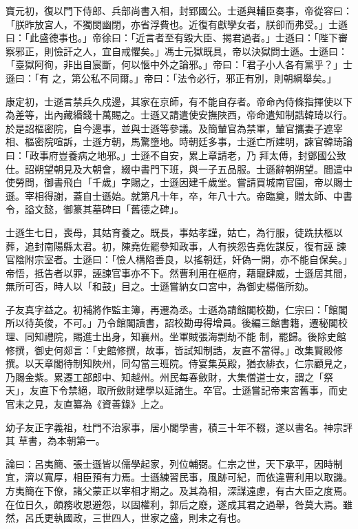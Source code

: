 \begin{pinyinscope}
 寶元初，復以門下侍郎、兵部尚書入相，封郢國公。士遜與輔臣奏事，帝從容曰：「朕昨放宮人，不獨閔幽閉，亦省浮費也。近復有獻孿女者，朕卻而弗受。」士遜曰：「此盛德事也。」帝徐曰：「近言者至有毀大臣、揭君過者。」士遜曰：「陛下審察邪正，則憸訐之人，宜自戒懼矣。」馮士元獄既具，帝以決獄問士遜。士遜曰：「臺獄阿徇，非出自宸斷，何以愜中外之論邪。」帝曰：「君子小人各有黨乎？」士遜曰：「有
 之，第公私不同爾。」帝曰：「法令必行，邪正有別，則朝綱舉矣。」



 康定初，士遜言禁兵久戍邊，其家在京師，有不能自存者。帝命內侍條指揮使以下為差等，出內藏緡錢十萬賜之。士遜又請遣使安撫陜西，帝命遣知制誥韓琦以行。於是詔樞密院，自今邊事，並與士遜等參議。及簡輦官為禁軍，輦官攜妻子遮宰相、樞密院喧訴，士遜方朝，馬驚墮地。時朝廷多事，士遜亡所建明，諫官韓琦論曰：「政事府豈養病之地邪。」士遜不自安，累上章請老，乃
 拜太傅，封鄧國公致仕。詔朔望朝見及大朝會，綴中書門下班，與一子五品服。士遜辭朝朔望。間遣中使勞問，御書飛白「千歲」字賜之，士遜因建千歲堂。嘗請買城南官園，帝以賜士遜。宰相得謝，蓋自士遜始。就第凡十年，卒，年八十六。帝臨奠，贈太師、中書令，謚文懿，御篆其墓碑曰「舊德之碑」。



 士遜生七日，喪母，其姑育養之。既長，事姑孝謹，姑亡，為行服，徒跣扶柩以葬，追封南陽縣太君。初，陳堯佐罷參知政事，人有挾怨告堯佐謀反，復有誣
 諫官陰附宗室者。士遜曰：「憸人構陷善良，以搖朝廷，奸偽一開，亦不能自保矣。」帝悟，抵告者以罪，誣諫官事亦不下。然曹利用在樞府，藉寵肆威，士遜居其間，無所可否，時人以「和鼓」目之。士遜嘗納女口宮中，為御史楊偕所劾。



 子友真字益之。初補將作監主簿，再遷為丞。士遜為請館閣校勘，仁宗曰：「館閣所以待英俊，不可。」乃令館閣讀書，詔校勘毋得增員。後編三館書籍，遷秘閣校理、同知禮院，賜進士出身，知襄州。坐軍賊張海剽劫不能
 制，罷歸。後除史館修撰，御史何郯言：「史館修撰，故事，皆試知制誥，友直不當得。」改集賢殿修撰。以天章閣待制知陜州，同勾當三班院。侍宴集英殿，猶衣緋衣，仁宗顧見之，乃賜金紫。累遷工部郎中、知越州。州民每春斂財，大集僧道士女，謂之「祭天」，友直下令禁絕，取所斂財建學以延諸生。卒官。士遜嘗記帝東宮舊事，而史官未之見，友直纂為《資善錄》上之。



 幼子友正字義祖，杜門不治家事，居小閣學書，積三十年不輟，遂以書名。神宗評其
 草書，為本朝第一。



 論曰：呂夷簡、張士遜皆以儒學起家，列位輔弼。仁宗之世，天下承平，因時制宜，濟以寬厚，相臣預有力焉。士遜練習民事，風跡可紀，而依違曹利用以取譏。方夷簡在下僚，諸父蒙正以宰相才期之。及其為相，深謀遠慮，有古大臣之度焉。在位日久，頗務收恩避怨，以固權利，郭后之廢，遂成其君之過舉，咎莫大焉。雖然，呂氏更執國政，三世四人，世家之盛，則未之有也。



\end{pinyinscope}